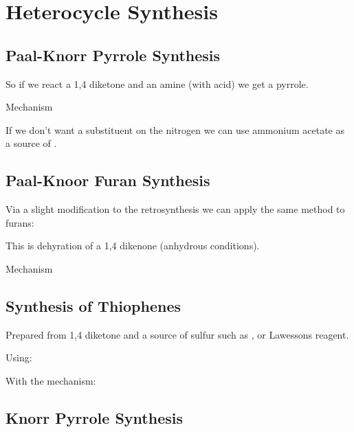 \section{Heterocycle Synthesis}

\subsection{Paal-Knorr Pyrrole Synthesis}


So if we react a 1,4 diketone and an amine (with acid) we get a pyrrole.


Mechanism


If we don't want a substituent on the nitrogen we can use ammonium acetate as a source of .


\subsection{Paal-Knoor Furan Synthesis}

Via a slight modification to the retrosynthesis we can apply the same method to furans:


This is dehyration of a 1,4 dikenone (anhydrous conditions).


Mechanism


\pagebreak

\subsection{Synthesis of Thiophenes}

Prepared from 1,4 diketone and a source of sulfur such as ,  or Lawessons reagent.


Using:


With the mechanism:


\pagebreak

\subsection{Knorr Pyrrole Synthesis}

